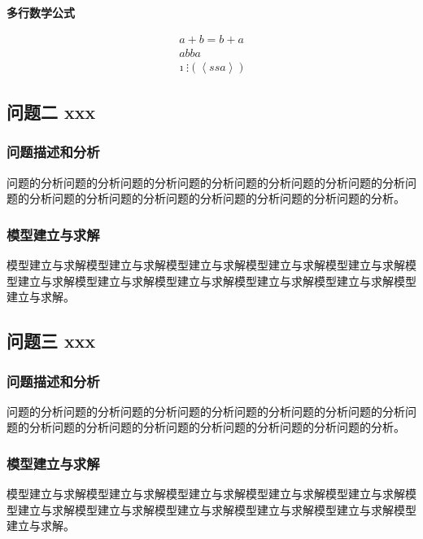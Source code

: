 \documentclass{cumcmthesis}
\begin{document}
	\textbf{多行数学公式}
	
	\begin{gather}
		a + b = b + a \\
		ab ba
	\end{gather}
	\begin{gather}
		\imath \vdots \left ( \left \langle ssa \right \rangle \right )
	\end{gather}
	
%	
	
	\subsection{问题二 xxx}
	\subsubsection{问题描述和分析}
	问题的分析问题的分析问题的分析问题的分析问题的分析问题的分析问题的分析问题的分析问题的分析问题的分析问题的分析问题的分析问题的分析问题的分析。
	\subsubsection{模型建立与求解}
	模型建立与求解模型建立与求解模型建立与求解模型建立与求解模型建立与求解模型建立与求解模型建立与求解模型建立与求解模型建立与求解模型建立与求解模型建立与求解。
	
	\subsection{问题三 xxx}
	\subsubsection{问题描述和分析}
	问题的分析问题的分析问题的分析问题的分析问题的分析问题的分析问题的分析问题的分析问题的分析问题的分析问题的分析问题的分析问题的分析问题的分析。
	\subsubsection{模型建立与求解}
	模型建立与求解模型建立与求解模型建立与求解模型建立与求解模型建立与求解模型建立与求解模型建立与求解模型建立与求解模型建立与求解模型建立与求解模型建立与求解。
	
\end{document}
